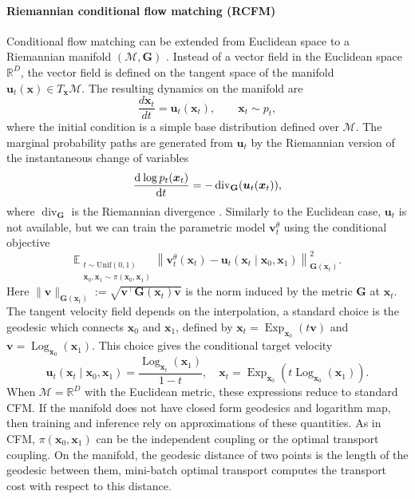 \paragraph{Riemannian conditional flow matching (RCFM)}
Conditional flow matching can be extended from Euclidean space to a Riemannian manifold $(\mathcal{M}, \mathbf{G})$ \citep{Chen2024}. 
Instead of a vector field in the Euclidean space $\mathbb{R}^D$, the vector field is defined on the tangent space of the manifold $\boldsymbol{u}_t(\boldsymbol{x})\in T_{\boldsymbol{x}}\mathcal{M}$. The resulting dynamics on the manifold are
\[
\frac{d\boldsymbol{x}_t}{dt} = \boldsymbol{u}_t(\boldsymbol{x}_t), \qquad \boldsymbol{x}_t\sim p_t,
\]
where the initial condition is a simple base distribution defined over $\mathcal{M}$.
The marginal probability paths are generated from $\boldsymbol{u}_t$ by the Riemannian version of the instantaneous change of variables 
\begin{equation*}
    \dv[]{\log p_t(\boldsymbol{x}_t)}{t} = - \operatorname{div}_{\mathbf{G}}(\boldsymbol{u}_t(\boldsymbol{x}_t)), 
\end{equation*}
where $\operatorname{div}_\mathbf{G}$ is the Riemannian divergence \citep{Lee2018}. Similarly to the Euclidean case, $\boldsymbol{u}_t$ is not available, but we can train the parametric model $\boldsymbol{v}_t^\theta$ using the conditional objective 
\begin{equation*}
\mathbb{E}_{\substack{t\sim \mathrm{Unif}(0,1) \\ \boldsymbol{x}_0,\boldsymbol{x}_1\sim\pi(\boldsymbol{x}_0,\boldsymbol{x}_1)} }
\left\|\boldsymbol{v}_t^\theta(\boldsymbol{x}_t){-}\boldsymbol{u}_t(\boldsymbol{x}_t\mid \boldsymbol{x}_0,\boldsymbol{x}_1)\right\|^2_{\mathbf{G}(\boldsymbol{x}_t)}.
\end{equation*}
Here $\| \boldsymbol{v}  \|_{\mathbf{G}(\boldsymbol{x}_t)} := \sqrt{\boldsymbol{v}^\top \mathbf{G}(\boldsymbol{x}_t)\boldsymbol{v} } $ is the norm induced by the metric $\mathbf{G}$ at $\boldsymbol{x}_t$. The tangent velocity field depends on the interpolation, a standard choice is the geodesic which connects $\boldsymbol{x}_0$ and  $\boldsymbol{x}_1$, defined by  $\boldsymbol{x}_t = \operatorname{Exp}_{\boldsymbol{x}_0}( t \boldsymbol{v})$ and $\boldsymbol{v} = \operatorname{Log}_{\boldsymbol{x}_0}(\boldsymbol{x}_1)$. This choice gives the conditional target velocity
\[
\boldsymbol{u}_t(\boldsymbol{x}_t\mid\boldsymbol{x}_0,\boldsymbol{x}_1)
=\frac{\operatorname{Log}_{\boldsymbol{x}_t}(\boldsymbol{x}_1)}{1-t}, \quad \boldsymbol{x}_t = \operatorname{Exp}_{\boldsymbol{x}_0}( t \operatorname{Log}_{\boldsymbol{x}_0}(\boldsymbol{x}_1)).
\]
When $\mathcal{M}=\mathbb{R}^D$ with the Euclidean metric, these expressions reduce to standard CFM.
If the manifold does not have closed form geodesics and logarithm map, then training and inference rely on approximations of these quantities. As in CFM, $\pi(\boldsymbol{x}_0,\boldsymbol{x}_1)$ can be the independent coupling or the optimal transport coupling. On the manifold, the geodesic distance of two points is the length of the geodesic between them, mini-batch optimal transport computes the transport cost with respect to this distance. 



